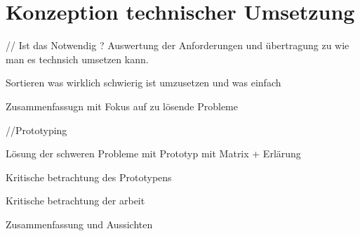\chapter{Konzeption technischer Umsetzung}\label{chapter:tanforderungen}


// Ist das Notwendig ?
Auswertung der Anforderungen und übertragung zu wie man es technsich umsetzen kann.

Sortieren was wirklich schwierig ist umzusetzen und was einfach

Zusammenfassugn mit Fokus auf zu lösende Probleme

//Prototyping

Lösung der schweren Probleme mit Prototyp mit Matrix + Erlärung 

Kritische betrachtung des Prototypens 

Kritische betrachtung der arbeit

Zusammenfassung und Aussichten

